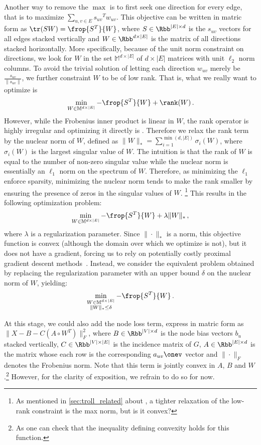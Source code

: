 Another way to remove the $\max$ is to first seek one direction for every edge, that is to maximize
$\sum_{u,v\in E} {s_{uv}}^T w_{uv}$. This objective can be written in matric form as $\tr(SW) =
\frop{S^T}{W}$, where $S \in \Rbb^{|E| \times d}$ is the $s_{uv}$ vectors for all edges stacked
vertically and $W \in \Rbb^{d \times |E|}$ is the matrix of all directions stacked horizontally.
More specifically, because of the unit norm constraint on directions, we look for $W$ in the set
$\mathbb{M}^{d\times |E|}$ of $d\times |E|$ matrices with unit $\ell_2$ norm columns. To avoid the
trivial solution of letting each direction $w_{uv}$ merely be $\frac{s_{uv}}{\|s_{uv}\|}$, we
further constraint $W$ to be of low rank. That is, what we really want to optimize is \[\min_{W\in
\mathbb{M}^{d\times |E|}} -\frop{S^T}{W} + \rank(W)\,.\] However, while the Frobenius inner product is
linear in $W$, the rank operator is highly irregular and optimizing it directly is \NPc{}. Therefore
we relax the rank term by the nuclear norm of $W$, defined as $\|W\|_* = \sum_{i=1}^{\min(d,|E|)}
\sigma_i(W)$, where $\sigma_i(W)$ is the \ith{} largest singular value of $W$. The intuition is
that the rank of $W$ is
equal to the number of non-zero singular value while the nuclear norm is essentially an $\ell_1$ norm on
the spectrum of $W$. Therefore, as minimizing the $\ell_1$ enforce sparsity, minimizing the nuclear
norm tends to make the rank smaller by ensuring the presence of zeros in the singular values of $W$.
\footnote{As mentioned in \autoref{sec:troll_related} about \autocite{OnlineCompletion17}, a tighter
relaxation of the low-rank constraint is the max norm, but is it convex?} This
results in the following optimization problem: \[\min_{W\in \mathbb{M}^{d\times |E|}} -\frop{S^T}{W}
+ \lambda \|W\|_*\,,\] where $\lambda$ is a regularization parameter. Since $\|\cdot\|_*$ is a norm, this
objective function is convex (although the domain over which we optimize is not), but it does not
have a gradient, forcing us to rely on potentially costly proximal gradient descent
methods~\autocite{Parikh2013a}. Instead, we consider the equivalent problem obtained by replacing
the regularization parameter with an upper bound $\delta$ on the nuclear norm of $W$, yielding:
\begin{equation*}
  \min_{\substack{W\in \mathbb{M}^{d\times |E|} \\ \|W\|_* \leq \delta}} -\frop{S^T}{W}\,.
\end{equation*}

At this stage, we could also add the node loss term, express in matric form as $\|X - B -
C\left(A\circ W^T \right)\|_F^2$, where $B\in \Rbb^{|V| \times d}$ is the node bias vectors $b_u$
stacked vertically, $C \in \Rbb^{|V| \times |E|}$ is the incidence matrix of $G$, $A \in \Rbb^{|E|
\times d}$ is the matrix whose each row is the corresponding $a_{uv}\onev$ vector and $\|\cdot\|_F$
denotes the Frobenius norm. Note that this term is jointly convex in $A$, $B$ and $W$.\footnote{As
one can check that the inequality defining convexity holds for this function.} However, for the
clarity of exposition, we refrain to do so for now.

